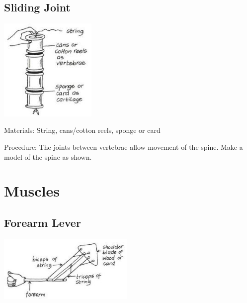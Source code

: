 \begin{multicols}{2}
\subsection{Sliding Joint}

\begin{center}
\includegraphics[width=0.35\textwidth]{./img/vso/sliding-joint.jpg}
\end{center}

\begin{description*}
\item[Materials:]{String, cans/cotton reels, sponge or card}
\item[Procedure:]{The joints between vertebrae
allow movement of the spine.
Make a model of the spine as
shown.}
\end{description*}


\section*{Muscles} 


\subsection{Forearm Lever}

\begin{center}
\includegraphics[width=0.49\textwidth]{./img/vso/forearm.jpg}
\end{center}


\end{multicols}
